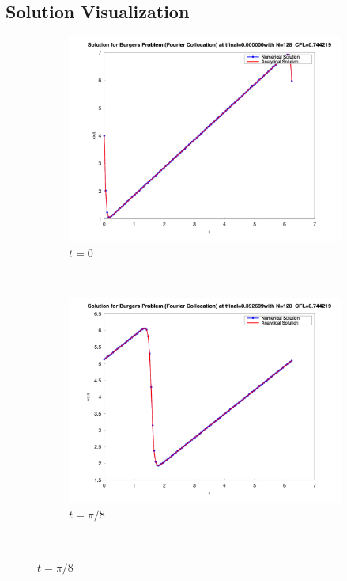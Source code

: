 \subsection{Solution Visualization}
\begin{figure}[H]
	\centering
	\begin{subfigure}{0.5\textwidth}
		\includegraphics[width=\textwidth]{media/burger_tfinal_fc_128_0.000000.png}
		\caption{$t=0$}
		\label{sfig:sublabel1}
	\end{subfigure}%
	~
	\begin{subfigure}{0.5\textwidth}
		\includegraphics[width=\textwidth]{media/burger_tfinal_fc_128_0.392699.png}
		\caption{$t = \pi/ 8$}
		\label{sfig:sublabel2}
	\end{subfigure}\\

\end{figure}
